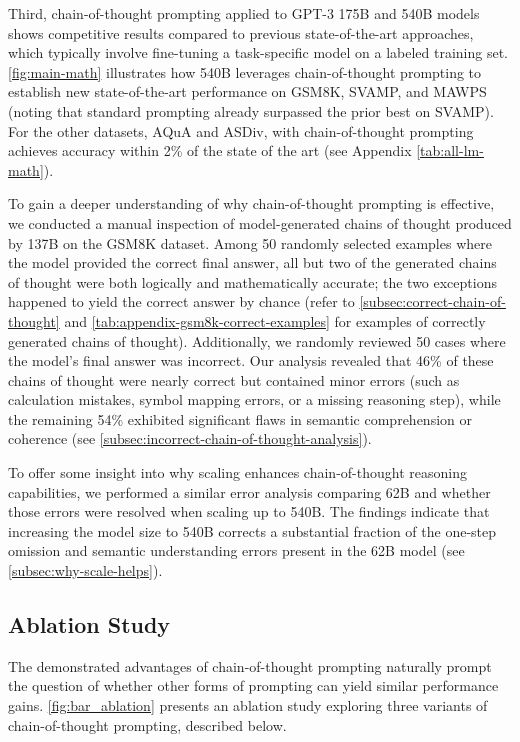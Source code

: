 Third, chain-of-thought prompting applied to GPT-3 175B and \palm{} 540B models shows competitive results compared to previous state-of-the-art approaches, which typically involve fine-tuning a task-specific model on a labeled training set.  
\cref{fig:main-math} illustrates how \palm{} 540B leverages chain-of-thought prompting to establish new state-of-the-art performance on GSM8K, SVAMP, and MAWPS (noting that standard prompting already surpassed the prior best on SVAMP). For the other datasets, AQuA and ASDiv, \palm{} with chain-of-thought prompting achieves accuracy within 2\% of the state of the art (see Appendix \cref{tab:all-lm-math}).

To gain a deeper understanding of why chain-of-thought prompting is effective, we conducted a manual inspection of model-generated chains of thought produced by \lamda{} 137B on the GSM8K dataset. Among 50 randomly selected examples where the model provided the correct final answer, all but two of the generated chains of thought were both logically and mathematically accurate; the two exceptions happened to yield the correct answer by chance (refer to \cref{subsec:correct-chain-of-thought} and \cref{tab:appendix-gsm8k-correct-examples} for examples of correctly generated chains of thought). Additionally, we randomly reviewed 50 cases where the model's final answer was incorrect. Our analysis revealed that 46\% of these chains of thought were nearly correct but contained minor errors (such as calculation mistakes, symbol mapping errors, or a missing reasoning step), while the remaining 54\% exhibited significant flaws in semantic comprehension or coherence (see \cref{subsec:incorrect-chain-of-thought-analysis}).

To offer some insight into why scaling enhances chain-of-thought reasoning capabilities, we performed a similar error analysis comparing \palm{} 62B and whether those errors were resolved when scaling up to \palm{} 540B. The findings indicate that increasing the model size to 540B corrects a substantial fraction of the one-step omission and semantic understanding errors present in the 62B model (see \cref{subsec:why-scale-helps}).

\subsection{Ablation Study}\label{subsec:math-ablation}

The demonstrated advantages of chain-of-thought prompting naturally prompt the question of whether other forms of prompting can yield similar performance gains. \cref{fig:bar_ablation} presents an ablation study exploring three variants of chain-of-thought prompting, described below.

